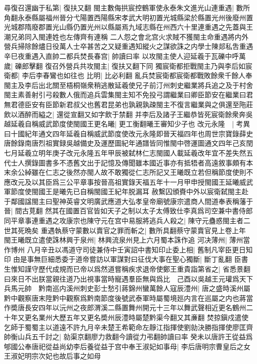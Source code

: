 尋復召還幽于私第|{
	復扶又翻}
閩主數侮拱宸控鶴軍使永泰朱文進光山連重遇|{
	數所角翻永泰縣屬福州晉分弋陽置西陽縣宋孝武大明初置光城縣梁於縣置光州後廢州置光城郡隋廢郡置光山縣仍置光州以縣屬焉九域志縣在州西六十里連重遇之先蓋與王潮兄弟同入閩連姓也左傳齊有連稱}
二人怨之會北宫火求賊不獲閩主命重遇將内外營兵掃除餘燼日役萬人士卒甚苦之又疑重遇知縱火之謀欲誅之内學士陳郯私吿重遇辛巳夜重遇入直帥二都兵焚長春宫|{
	帥讀曰率}
以攻閩主使人迎延羲于瓦礫中呼萬歲|{
	礫郎擊翻}
復召外營兵共攻閩主|{
	復扶又翻下同}
獨宸衛都拒戰閩主乃與李后如宸衛都|{
	李后李春鸞也如往也}
比明|{
	比必利翻}
亂兵焚宸衛都宸衛都戰敗餘衆千餘人奉閩主及李后出北關至梧桐嶺衆稍逃散延羲使兄子前汀州刺史繼業將兵追之及于村舍閩主素善射引弓殺數人俄而追兵雲集閩主知不免投弓謂繼業曰卿臣節安在繼業曰君無君德臣安有臣節新君叔父也舊君昆弟也孰親孰疎閩主不復言繼業與之俱還至陁莊飲以酒醉而縊之|{
	還從宣翻又如字飲于禁翻}
并李后及諸子王繼恭皆死宸衛餘衆奔吳越延羲自稱威武節度使閩國王更名曦|{
	更工衡翻曦王審知少子也}
改元永隆　|{
	考異曰十國紀年通文四年延羲自稱威武節度使改元永隆即晉天福四年也周世宗寶錄薛史唐餘錄南唐烈祖實録吳越備史及運歷圖紀年通譜皆同惟閩中啓運圖通文四年己亥閏七月延羲立明年庚子改元永隆五年甲辰被弑林仁志閩國人載延羲改年宜不差失然五代士人撰錄圖書多不憑舊文出于記憶及傳聞雖本國近事亦有抵牾者高遠敘事頗有本末余公綽雖在仁志之後然亦閩人故不敢獨從仁志所記又王曦既立若但稱節度使則不應改元及以其臣爲三公平章事按晉高祖實錄天福五年十一月甲申授閩國王延曦威武軍節度使閩國王是曦先已自稱閩國王紀年脱漏耳}
赦繫囚頒賚中外以宸衛弑閩主赴于鄰國諡閩主曰聖神英睿文明廣武應道大弘孝皇帝廟號康宗遣商人間道奉表稱藩于晉|{
	間古莧翻}
然其在國置百官皆如天子之制以太子太傅致仕李真爲司空兼中書侍郎同平章事連重遇之攻康宗也陳守元在宫中易服將逃兵人殺之|{
	陳守元蠱惑閩主者二世其死晩矣}
重遇執蔡守蒙數以賣官之罪而斬之|{
	數所具翻蔡守蒙賣官見上卷上年}
閩王曦既立遣使誅林興于泉州|{
	林興流泉州見上六月蜀本誅作追}
河决薄州|{
	薄州當作博州}
八月辛丑以馮道守司徒兼侍中壬寅詔中書知印止委上相|{
	舊制凡宰臣更日知印}
由是事無巨細悉委于道帝嘗訪以軍謀對曰征伐大事在聖心獨斷|{
	斷丁亂翻}
臣書生惟知謹守歷代成規而已帝以爲然道嘗稱疾求退帝使鄭王重貴詣第省之|{
	省悉景翻}
曰來日不出朕當親往道乃出視事當時寵遇羣臣無與爲比　己酉以吳越王元瓘爲天下兵馬元帥　黔南巡内溪州刺史彭士愁引蔣錦州蠻萬餘人寇辰澧州|{
	唐之盛時溪州屬黔中觀察唐末陞黔中觀察爲黔南節度後號武泰軍時屬蜀境廵内言在巡屬之内也蔣當作奬唐長安四年以沅州之夜郎渭溪二縣置舞州開元十三年以舞武聲相近更名鶴州二十年又更名業州大歷五年又更名奬州辰澧時屬楚黔渠今翻又其亷翻}
焚掠鎭戍遣使乞師于蜀蜀主以道遠不許九月辛未楚王希範命左靜江指揮使劉勍決勝指揮使廖匡齊帥衡山兵五千討之|{
	勍渠京翻廖力救翻今讀從力弔翻帥讀曰率}
癸未以唐許王從益爲郇國公奉唐祀從益尚幼李后養從益于宫中奉王淑妃如事母|{
	李后唐明宗曹皇后之女王淑妃明宗次妃也故后事之如母}
